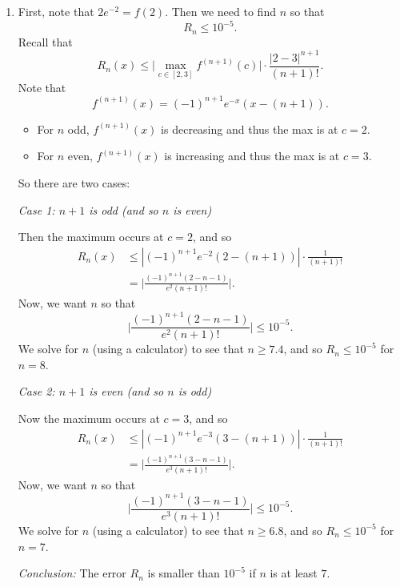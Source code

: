 \documentclass[noinstructornotes]{ximera}
\begin{document}
\begin{problem}
\begin{freeResponse}
\begin{enumerate}
	\item  First, note that $2e^{-2} = f(2)$.  
	Then we need to find $n$ so that
		\[
		R_n \leq 10^{-5}.
		\]
	Recall that
		\[
		R_n(x) \leq \biggr| \max_{c \in [2,3]} f^{(n+1)}(c) \biggr| \cdot \frac{|2-3|^{n+1}}{(n+1)!}.
		\]
	Note that
		\[
		f^{(n+1)}(x) = (-1)^{n+1} e^{-x} (x - (n+1)).
		\]
	\begin{itemize}
	\item For $n$ odd, $f^{(n+1)}(x)$ is decreasing and thus the max is at $c=2$.
	\item For $n$ even, $f^{(n+1)}(x)$ is increasing and thus the max is at $c=3$.  
	\end{itemize}
	
	So there are two cases:
	
	\vskip 10pt
	
	{\it Case 1:  $n+1$ is odd (and so $n$ is even)}
	
	Then the maximum occurs at $c=2$, and so
		\begin{align*}
		R_n(x) &\leq | (-1)^{n+1} e^{-2} (2 - (n+1)) | \cdot \frac{1}{(n+1)!}  \\
		&= \biggr| \frac{(-1)^{n+1} (2-n-1)}{e^2 (n+1)!} \biggr| .
		\end{align*}
	Now, we want $n$ so that 
		\[
		\biggr| \frac{(-1)^{n+1} (2-n-1)}{e^2 (n+1)!} \biggr| \leq 10^{-5}.
		\]
	We solve for $n$ (using a calculator) to see that $n \geq 7.4$, and so $R_n \leq 10^{-5}$ for $n = 8$.
	
	\vskip 10pt
	
	{\it Case 2:  $n+1$ is even (and so $n$ is odd)}
	
	Now the maximum occurs at $c=3$, and so
		\begin{align*}
		R_n(x) &\leq | (-1)^{n+1} e^{-3} (3 - (n+1)) | \cdot \frac{1}{(n+1)!}  \\
		&= \biggr| \frac{(-1)^{n+1} (3-n-1)}{e^3 (n+1)!} \biggr| .
		\end{align*}
	Now, we want $n$ so that 
		\[
		\biggr| \frac{(-1)^{n+1} (3-n-1)}{e^3 (n+1)!} \biggr| \leq 10^{-5}.
		\]
	We solve for $n$ (using a calculator) to see that $n \geq 6.8$, and so $R_n \leq 10^{-5}$ for $n = 7$.
	
	\vskip 10pt
	
	{\it Conclusion:} The error $R_n$ is smaller than $10^{-5}$ if $n$ is at least $7$.
	
	
	
	\end{enumerate}
	\end{freeResponse}

\end{problem}
\end{document}
